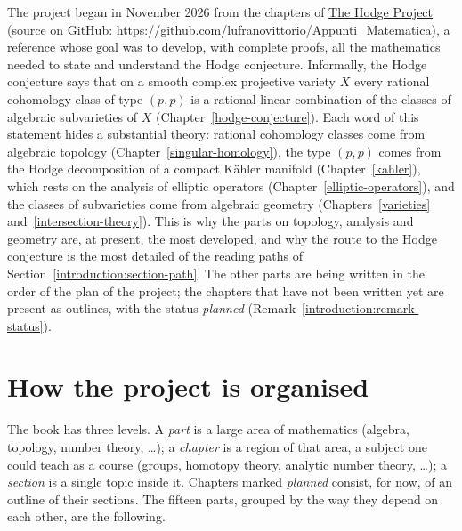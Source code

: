 \begin{remark}\label{introduction:remark-history}
The project began in November 2026 from the chapters of
\href{https://lufranovittorio.github.io/Appunti_Matematica/}{The Hodge Project}
(source on GitHub: \url{https://github.com/lufranovittorio/Appunti_Matematica}), a
reference whose goal was to develop, with complete proofs, all the mathematics
needed to state and understand the Hodge conjecture. Informally, the Hodge
conjecture says that on a smooth complex projective variety $X$ every rational
cohomology class of type $(p,p)$ is a rational linear combination of the
classes of algebraic subvarieties of $X$ (Chapter~\ref{hodge-conjecture}).
Each word of this statement hides a substantial theory: rational cohomology
classes come from algebraic topology (Chapter~\ref{singular-homology}), the
type $(p,p)$ comes from the Hodge decomposition of a compact K\"ahler manifold
(Chapter~\ref{kahler}), which rests on the analysis of elliptic
operators (Chapter~\ref{elliptic-operators}), and the classes of subvarieties
come from algebraic geometry (Chapters~\ref{varieties} and~\ref{intersection-theory}).
This is why the parts on topology, analysis and geometry are, at present, the
most developed, and why the route to the Hodge conjecture is the most detailed
of the reading paths of Section~\ref{introduction:section-path}. The other
parts are being written in the order of the plan of the project; the chapters
that have not been written yet are present as outlines, with the status
\emph{planned} (Remark~\ref{introduction:remark-status}).
\end{remark}

\section{How the project is organised}\label{introduction:section-organisation}

The book has three levels. A \emph{part} is a large area of mathematics
(algebra, topology, number theory, \ldots); a \emph{chapter} is a region of
that area, a subject one could teach as a course (groups, homotopy theory,
analytic number theory, \ldots); a \emph{section} is a single topic inside it.
Chapters marked \emph{planned} consist, for now, of an outline of their
sections. The fifteen parts, grouped by the way they depend on each other, are
the following.

